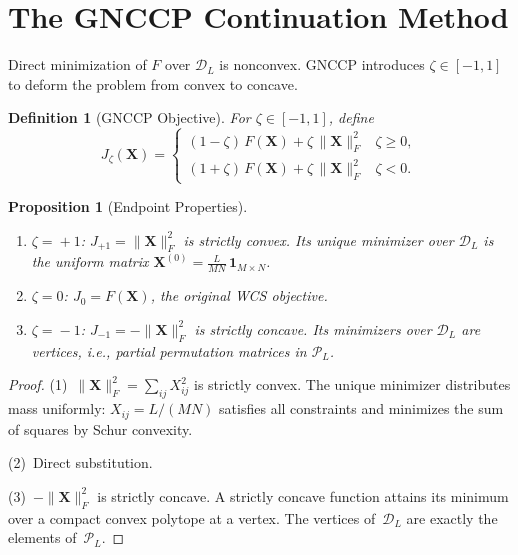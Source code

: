\documentclass[conference]{IEEEtran}
\newtheorem{proposition}{Proposition}
\newtheorem{definition}{Definition}
\begin{document}
\section{The GNCCP Continuation Method}
\label{sec:gnccp}

Direct minimization of $F$ over $\mathcal{D}_L$ is nonconvex.
GNCCP introduces $\zeta \!\in\! [-1,1]$ to deform the problem
from convex to concave.

\begin{definition}[GNCCP Objective]
\label{def:Jzeta}
For $\zeta \!\in\! [-1, 1]$, define
\begin{equation}
J_\zeta(\mathbf{X}) =
\begin{cases}
(1 - \zeta)\,F(\mathbf{X}) + \zeta\,\|\mathbf{X}\|_F^2
  & \zeta \geq 0, \\[6pt]
(1 + \zeta)\,F(\mathbf{X}) + \zeta\,\|\mathbf{X}\|_F^2
  & \zeta < 0.
\end{cases}
\label{eq:Jzeta}
\end{equation}
\end{definition}

\begin{proposition}[Endpoint Properties]
\label{prop:endpoints}\hfill
\begin{enumerate}
\item $\zeta \!=\! +1$:\;
  $J_{+1} = \|\mathbf{X}\|_F^2$ is strictly convex.
  Its unique minimizer over $\mathcal{D}_L$ is the
  uniform matrix $\mathbf{X}^{(0)} = \tfrac{L}{MN}\,\mathbf{1}_{M\times N}$.

\item $\zeta \!=\! 0$:\;
  $J_0 = F(\mathbf{X})$, the original WCS objective.

\item $\zeta \!=\! -1$:\;
  $J_{-1} = -\|\mathbf{X}\|_F^2$ is strictly concave.
  Its minimizers over $\mathcal{D}_L$ are vertices,
  i.e., partial permutation matrices in $\mathcal{P}_L$.
\end{enumerate}
\end{proposition}

\begin{proof}
(1)~$\|\mathbf{X}\|_F^2 = \sum_{ij} X_{ij}^2$ is strictly convex.
The unique minimizer distributes mass uniformly:
$X_{ij} = L/(MN)$ satisfies all constraints
and minimizes the sum of squares by Schur convexity.

(2)~Direct substitution.

(3)~$-\|\mathbf{X}\|_F^2$ is strictly concave.
A strictly concave function attains its minimum
over a compact convex polytope at a vertex.
The vertices of~$\mathcal{D}_L$ are
exactly the elements of~$\mathcal{P}_L$.
\end{proof}
\end{document}
